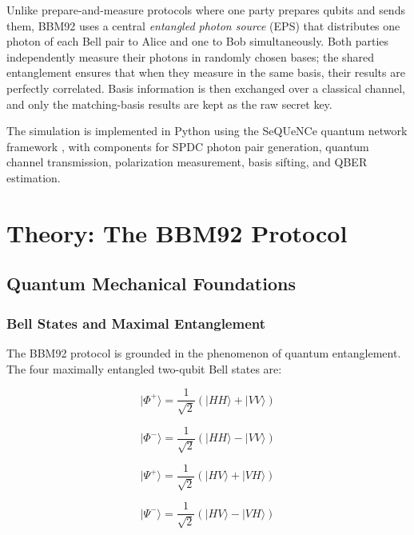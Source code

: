 \documentclass[12pt,oneside,letterpaper,english]{article}
\begin{document}
Unlike prepare-and-measure protocols where one party prepares qubits and sends them, BBM92 uses a central \emph{entangled photon source} (EPS) that distributes one photon of each Bell pair to Alice and one to Bob simultaneously. Both parties independently measure their photons in randomly chosen bases; the shared entanglement ensures that when they measure in the same basis, their results are perfectly correlated. Basis information is then exchanged over a classical channel, and only the matching-basis results are kept as the raw secret key.

The simulation is implemented in Python using the SeQUeNCe quantum network framework \cite{SequenceTutorial}, with components for SPDC photon pair generation, quantum channel transmission, polarization measurement, basis sifting, and QBER estimation.

\section{Theory: The BBM92 Protocol}

\subsection{Quantum Mechanical Foundations}

\subsubsection{Bell States and Maximal Entanglement}

The BBM92 protocol is grounded in the phenomenon of quantum entanglement. The four maximally entangled two-qubit Bell states are:

\begin{equation}
|\Phi^+\rangle = \frac{1}{\sqrt{2}}\left(|HH\rangle + |VV\rangle\right)
\end{equation}

\begin{equation}
|\Phi^-\rangle = \frac{1}{\sqrt{2}}\left(|HH\rangle - |VV\rangle\right)
\end{equation}

\begin{equation}
|\Psi^+\rangle = \frac{1}{\sqrt{2}}\left(|HV\rangle + |VH\rangle\right)
\end{equation}

\begin{equation}
|\Psi^-\rangle = \frac{1}{\sqrt{2}}\left(|HV\rangle - |VH\rangle\right)
\end{equation}
\end{document}
